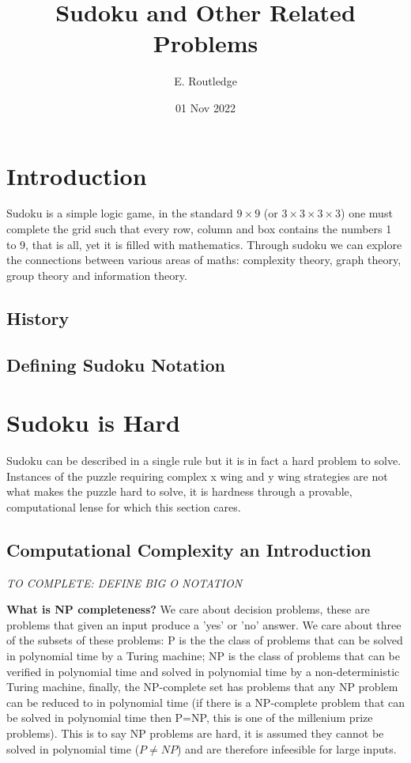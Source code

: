 \documentclass[a4paper,12pt]{article}
\author{E. Routledge}
\date{01 Nov 2022}
\title{Sudoku and Other Related Problems}
\begin{document}
\lstset{language=Python}
\maketitle

\section{Introduction}
		Sudoku is a simple logic game, in the standard $9 \times 9$ (or $3 \times 3 \times 3 \times 3$) 
		one must complete the grid such that every row, column and box contains the numbers 1 to 9, that is all,
		yet it is filled with mathematics. Through sudoku we can explore the connections between various areas of maths: complexity theory, graph theory, group theory and information theory.
		

	\subsection{History}
	
	\subsection{Defining Sudoku Notation}
\section{Sudoku is Hard}

		Sudoku can be described in a single rule but it is in fact a hard problem to solve.
		Instances of the puzzle requiring complex x wing and y wing strategies are not what makes the puzzle hard to solve,
		it is hardness through a provable, computational lense for which this section cares. 
		
	\subsection{Computational Complexity an Introduction}
	
	 \textit{TO COMPLETE: DEFINE BIG O NOTATION}
	 
		\textbf{What is NP completeness?}
		We care about decision problems, these are problems that given an input  produce a 'yes' or 'no' answer. We care about three of the subsets of these problems: P is the the class of problems that can be solved in polynomial time by a Turing machine; NP is the class of problems that can be verified in polynomial time and solved in polynomial time by a non-deterministic Turing machine, finally, the NP-complete set has problems that any NP problem can be reduced to in polynomial time (if there is a NP-complete problem that can be solved in polynomial time then P=NP, this is one of the millenium prize problems).
		This is to say NP problems are hard, it is assumed they cannot be solved in polynomial time ($P \neq NP$) and are therefore infeesible for large inputs.
\end{document}
